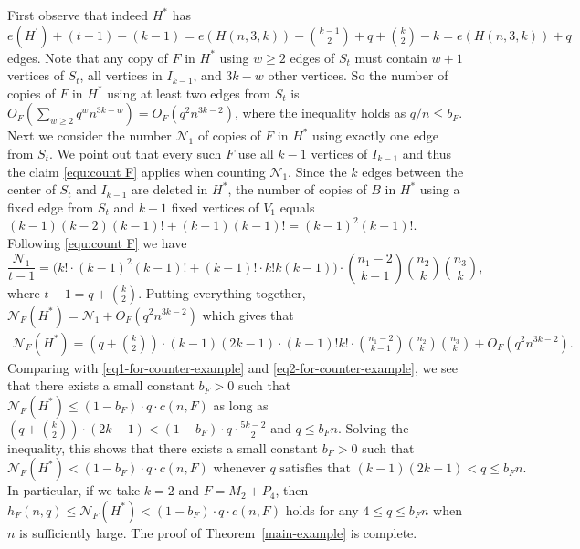 \documentclass[10pt]{article}
\def\QED{{\hfill\enspace\vrule height8pt depth0pt width8pt}}
\begin{document}
First observe that indeed $H^*$ has $e(H^\prime)+(t-1)-(k-1)=e(H(n,3,k))-\binom{k-1}{2}+q+\binom{k}{2}-k=e(H(n,3,k))+q$ edges.
Note that any copy of $F$ in $H^*$ using $w\geq 2$ edges of $S_t$ must contain $w+1$ vertices of $S_t$, all vertices in $I_{k-1}$, and $3k-w$ other vertices.
So the number of copies of $F$ in $H^*$ using at least two edges from $S_t$ is $O_F(\sum_{w\geq 2} q^w n^{3k-w})=O_F(q^2n^{3k-2})$, where the inequality holds as $q/n\leq b_F$.
Next we consider the number $\mathcal{N}_1$ of copies of $F$ in $H^*$ using exactly one edge from $S_t$.
We point out that every such $F$ use all $k-1$ vertices of $I_{k-1}$ and thus the claim \eqref{equ:count F} applies when counting $\mathcal{N}_1$.
Since the $k$ edges between the center of $S_t$ and $I_{k-1}$ are deleted in $H^*$,
the number of copies of $B$ in $H^*$ using a fixed edge from $S_t$ and $k-1$ fixed vertices of $V_1$ equals $(k-1)(k-2)(k-1)!+(k-1)(k-1)!=(k-1)^2(k-1)!$.
Following \eqref{equ:count F} we have
$$\frac{\mathcal{N}_1}{t-1}=\bigg(k!\cdot (k-1)^2(k-1)!+(k-1)!\cdot k!k(k-1)\bigg)\cdot {n_1-2 \choose k-1}{n_2 \choose k}{n_3 \choose k},$$
where $t-1=q+\binom{k}{2}$.
Putting everything together, $\mathcal{N}_F(H^*)=\mathcal{N}_1+O_F(q^2n^{3k-2})$ which gives that
\begin{align}\label{eq2-for-counter-example}
\mathcal{N}_F(H^*)=\left(q+{k \choose 2}\right)\cdot (k-1)(2k-1)\cdot (k-1)!k!\cdot {n_1-2 \choose k-1}{n_2 \choose k}{n_3 \choose k}+O_F(q^2n^{3k-2}).
\end{align}
Comparing with \eqref{eq1-for-counter-example} and \eqref{eq2-for-counter-example}, we see that there exists a small constant $b_F>0$ such that
$\mathcal{N}_F(H^*)\leq (1-b_F)\cdot q\cdot c(n,F)$ as long as $\left(q+\binom{k}{2}\right)\cdot(2k-1)<(1-b_F)\cdot q\cdot \frac{5k-2}{2}$ and $q\leq b_F n.$
Solving the inequality, this shows that there exists a small constant $b_F>0$ such that
$$\mathcal{N}_F(H^*)<(1-b_F)\cdot q\cdot c(n,F) \mbox{ whenever } q \mbox{ satisfies that } (k-1)(2k-1)< q\leq  b_F n.$$
In particular, if we take $k=2$ and $F=M_2+P_4$, then $h_F(n,q)\leq \mathcal{N}_F(H^*)< (1-b_F)\cdot q\cdot c(n,F)$ holds for any $4\leq q\leq b_F n$ when $n$ is sufficiently large.
The proof of Theorem~\ref{main-example} is complete.
\QED


\bigskip
\end{document}
